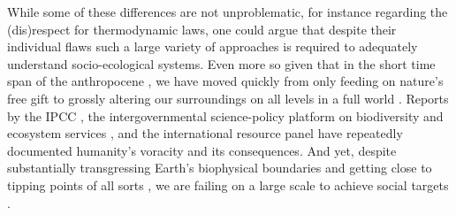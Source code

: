 \documentclass{article}
\begin{document}
\begin{refsection}
While some of these differences are not unproblematic, for instance regarding the (dis)respect for thermodynamic laws, one could argue that despite their individual flaws such a large variety of approaches is required to adequately understand socio-ecological systems. Even more so given that in the short time span of the anthropocene \parencite{crutzen_2006}, we have moved quickly from only feeding on nature's free gift \parencite{karsten_1987} to grossly altering our surroundings on all levels in a full world \parencite{daly_2005}. Reports by the IPCC \parencite[e.g.][]{ipcc_2022}, the intergovernmental science-policy platform on biodiversity and ecosystem services \parencite*[e.g. IPBES,][]{ipbes_2019}, and the international resource panel \parencite[e.g.][]{unep_2016} have repeatedly documented humanity's voracity and its consequences. And yet, despite substantially transgressing Earth's biophysical boundaries and getting close to tipping points of all sorts \parencite{ceballos_2015,steffen_2015, steffen_2018}, we are failing on a large scale to achieve social targets \parencite{fanning_2022}.


\noindent{}



\end{refsection}
\end{document}
